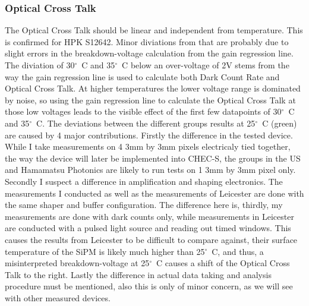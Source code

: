 \documentclass[article,type=msc,colorback,accentcolor=tud9c]{tudthesis}
\begin{document}
\begin{figure}[h]
\begin{centering}
\caption{}
\label{fig:}
\end{centering}
\end{figure}




\newpage
\subsubsection{Optical Cross Talk}
The Optical Cross Talk should be linear and independent from temperature. This is confirmed for HPK S12642. Minor diviations from that are probably due to slight errors in the breakdown-voltage calculation from the gain regression line. The diviation of 30${^\circ}$~C and 35${^\circ}$~C below an over-voltage of 2V stems from the way the gain regression line is used to calculate both Dark Count Rate and Optical Cross Talk. At higher temperatures the lower voltage range is dominated by noise, so using the gain regression line to calculate the Optical Cross Talk at those low voltages leads to the visible effect of the first few datapoints of 30${^\circ}$~C and 35${^\circ}$~C. 
The deviations between the different groups results at 25${^\circ}$~C (green) are caused by 4 major contributions. Firstly the difference in the tested device. While I take measurements on 4 3mm by 3mm pixels electricaly tied together, the way the device will later be implemented into CHEC-S, the groups in the US and Hamamatsu Photonics are likely to run tests on 1 3mm by 3mm pixel only. Secondly I suspect a difference in amplification and shaping electronics. The measurements I conducted as well as the measurements of Leicester are done with the same shaper and buffer configuration. The difference here is, thirdly, my measurements are done with dark counts only, while measurements in Leicester are conducted with a pulsed light source and reading out timed windows. This causes the results from Leicester to be difficult to compare against, their surface temperature of the SiPM is likely much higher than 25${^\circ}$~C, and thus, a misinterpreted breakdown-voltage at 25${^\circ}$~C causes a shift of the Optical Cross Talk to the right. Lastly the difference in actual data taking and analysis procedure must be mentioned, also this is only of minor concern, as we will see with other measured devices.
\end{document}
